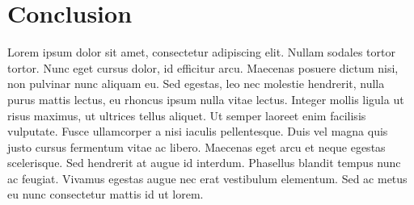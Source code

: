 \chapter{Conclusion}

Lorem ipsum dolor sit amet, consectetur adipiscing elit. Nullam sodales tortor tortor. Nunc eget cursus dolor, id efficitur arcu. Maecenas posuere dictum nisi, non pulvinar nunc aliquam eu. Sed egestas, leo nec molestie hendrerit, nulla purus mattis lectus, eu rhoncus ipsum nulla vitae lectus. Integer mollis ligula ut risus maximus, ut ultrices tellus aliquet. Ut semper laoreet enim facilisis vulputate. Fusce ullamcorper a nisi iaculis pellentesque. Duis vel magna quis justo cursus fermentum vitae ac libero. Maecenas eget arcu et neque egestas scelerisque. Sed hendrerit at augue id interdum. Phasellus blandit tempus nunc ac feugiat. Vivamus egestas augue nec erat vestibulum elementum. Sed ac metus eu nunc consectetur mattis id ut lorem.